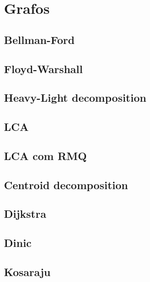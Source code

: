 \documentclass[12pt, a4paper, twoside]{article}
\begin{document}
%
%

\section{Grafos}

\subsection{Bellman-Ford}


\subsection{Floyd-Warshall}


\subsection{Heavy-Light decomposition}


\subsection{LCA}


\subsection{LCA com RMQ}


\subsection{Centroid decomposition}


\subsection{Dijkstra}


\subsection{Dinic}


\subsection{Kosaraju}

\end{document}
